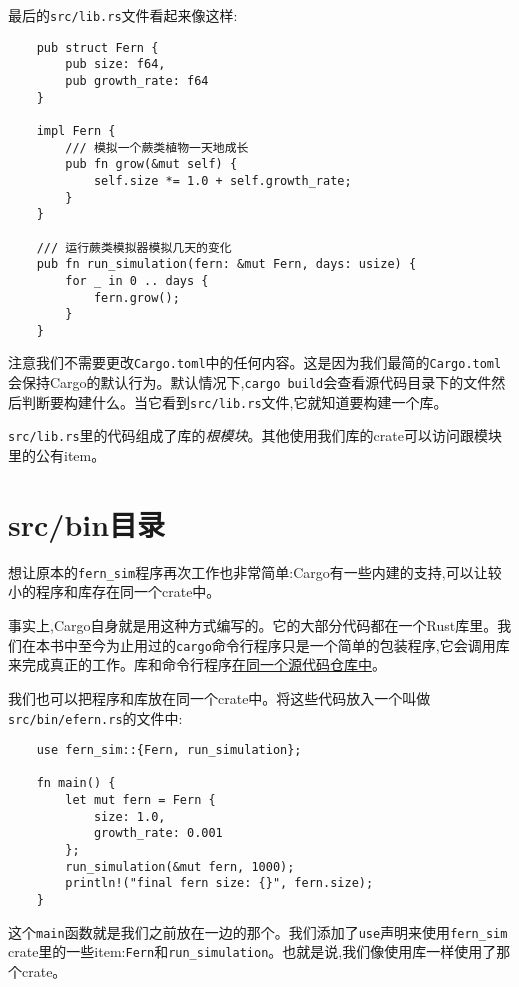 最后的\texttt{src/lib.rs}文件看起来像这样:
\begin{verbatim}
    pub struct Fern {
        pub size: f64,
        pub growth_rate: f64
    }

    impl Fern {
        /// 模拟一个蕨类植物一天地成长
        pub fn grow(&mut self) {
            self.size *= 1.0 + self.growth_rate;
        }
    }

    /// 运行蕨类模拟器模拟几天的变化
    pub fn run_simulation(fern: &mut Fern, days: usize) {
        for _ in 0 .. days {
            fern.grow();
        }
    }
\end{verbatim}

注意我们不需要更改\texttt{Cargo.toml}中的任何内容。这是因为我们最简的\texttt{Cargo.toml}会保持Cargo的默认行为。默认情况下,\texttt{cargo build}会查看源代码目录下的文件然后判断要构建什么。当它看到\texttt{src/lib.rs}文件,它就知道要构建一个库。

\texttt{src/lib.rs}里的代码组成了库的\emph{根模块}。其他使用我们库的crate可以访问跟模块里的公有item。

\section{src/bin目录}\label{src/bin}

想让原本的\texttt{fern\_sim}程序再次工作也非常简单:Cargo有一些内建的支持,可以让较小的程序和库存在同一个crate中。

事实上,Cargo自身就是用这种方式编写的。它的大部分代码都在一个Rust库里。我们在本书中至今为止用过的\texttt{cargo}命令行程序只是一个简单的包装程序,它会调用库来完成真正的工作。库和命令行程序\href{https://github.com/rust-lang/cargo}{在同一个源代码仓库中}。

我们也可以把程序和库放在同一个crate中。将这些代码放入一个叫做\texttt{src/bin/efern.rs}的文件中:
\begin{verbatim}
    use fern_sim::{Fern, run_simulation};

    fn main() {
        let mut fern = Fern {
            size: 1.0,
            growth_rate: 0.001
        };
        run_simulation(&mut fern, 1000);
        println!("final fern size: {}", fern.size);
    }
\end{verbatim}

这个\texttt{main}函数就是我们之前放在一边的那个。我们添加了\texttt{use}声明来使用\texttt{fern\_sim} crate里的一些item:\texttt{Fern}和\texttt{run\_simulation}。也就是说,我们像使用库一样使用了那个crate。

